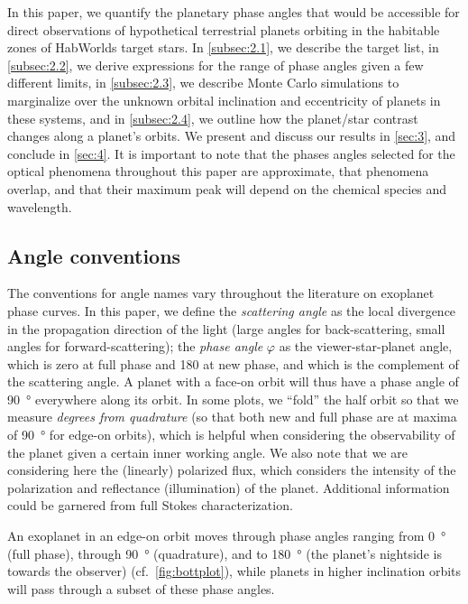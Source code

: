 \documentclass[usenatbib]{mnras}
\newcommand{\HWO}{HabWorlds\xspace}
\begin{document}
In this paper, we quantify the planetary phase angles that would be accessible for direct observations of hypothetical terrestrial planets orbiting in the habitable zones of \HWO target stars.
%
In \cref{subsec:2.1}, we describe the target list, in \cref{subsec:2.2}, we derive expressions for the range of phase angles given a few different limits, in \cref{subsec:2.3}, we describe Monte Carlo simulations to marginalize over the unknown orbital inclination and eccentricity of planets in these systems, and in \cref{subsec:2.4}, we outline how the planet/star contrast changes along a planet's orbits.  
%
We present and discuss our results in \cref{sec:3}, and conclude in \cref{sec:4}. 
It is important to note that the phases angles selected for the optical phenomena throughout this paper are approximate, that phenomena overlap, and that their maximum peak will depend on the chemical species and wavelength.

\subsection{Angle conventions}
The conventions for angle names vary throughout the literature on exoplanet phase curves. 
In this paper, we define the \emph{scattering angle} as the local divergence in the propagation direction of the light (large angles for back-scattering, small angles for forward-scattering); the \emph{phase angle} $\varphi$ as the viewer-star-planet angle, which is zero at full phase and 180 at new phase, and which is the complement of the scattering angle. 
A planet with a face-on orbit will thus have a phase angle of \qty{90}{\degree} everywhere along its orbit. 
In some plots, we \enquote{fold} the half orbit so that we measure \emph{degrees from quadrature} (so that both new and full phase are at maxima of \qty{90}{\degree} for edge-on orbits), which is helpful when considering the observability of the planet given a certain inner working angle. 
We also note that we are considering here the (linearly) polarized flux, which considers the intensity of the polarization and reflectance (illumination) of the planet. 
Additional information could be garnered from full Stokes characterization.

An exoplanet in an edge-on orbit moves through phase angles ranging from \qty{0}{\degree} (full phase), through \qty{90}{\degree} (quadrature), and to \qty{180}{\degree} (the planet's nightside is towards the observer) (cf.\ \cref{fig:bottplot}), while planets in higher inclination orbits will pass through a subset of these phase angles.
\end{document}
